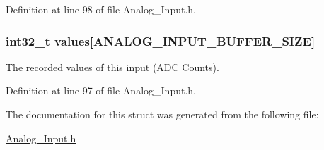 Definition at line 98 of file Analog\-\_\-\-Input.\-h.

\hypertarget{struct_analog___input__t_a5ec27e6ddaf65a4b494422578b93b246}{
\subsubsection[{values}]{\setlength{\rightskip}{0pt plus 5cm}int32\-\_\-t values\mbox{[}{\bf A\-N\-A\-L\-O\-G\-\_\-\-I\-N\-P\-U\-T\-\_\-\-B\-U\-F\-F\-E\-R\-\_\-\-S\-I\-Z\-E}\mbox{]}}}\label{struct_analog___input__t_a5ec27e6ddaf65a4b494422578b93b246}
The recorded values of this input (A\-D\-C Counts). 

Definition at line 97 of file Analog\-\_\-\-Input.\-h.



The documentation for this struct was generated from the following file\-:\begin{DoxyCompactItemize}
\item 
\hyperlink{_analog___input_8h}{Analog\-\_\-\-Input.\-h}\end{DoxyCompactItemize}
